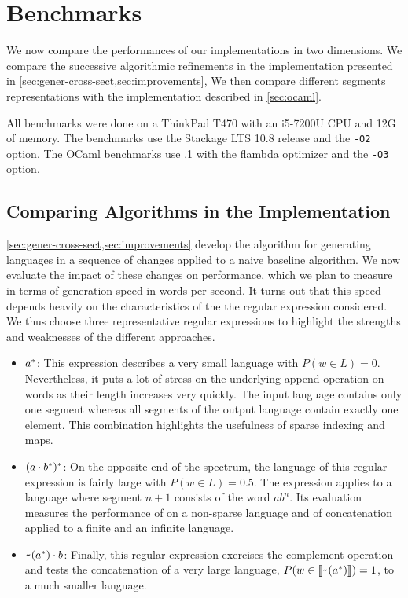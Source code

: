 \section{Benchmarks}
\label{sec:bench}


We now compare the performances of our implementations in two dimensions.
We compare the successive algorithmic refinements in the \haskell
implementation presented in \cref{sec:gener-cross-sect,sec:improvements},
We then compare different segments representations with
the \ocaml implementation described in \cref{sec:ocaml}.

All benchmarks were done on a ThinkPad T470 with an i5-7200U CPU and 12G of memory.
The \haskell benchmarks use the Stackage LTS 10.8 release and the \texttt{-O2} option.
The OCaml benchmarks use .1 with the flambda optimizer and the
\texttt{-O3} option.

\subsection{Comparing Algorithms in the \haskell Implementation}

\cref{sec:gener-cross-sect,sec:improvements} develop the
algorithm for generating languages in a sequence of changes applied to
a naive baseline algorithm. We now evaluate the impact of these
changes on performance, which we plan to measure in terms of
generation speed in words per second. It turns out that this speed
depends heavily on the characteristics of the the regular expression
considered. We thus choose three representative regular expressions to highlight the
strengths and weaknesses of the different approaches.
\begin{itemize}
\item $a^*$: This expression describes a very small language with $P (w\in L) = 0$.
  Nevertheless, it puts a lot of stress on the underlying
  append operation on words as their length increases very quickly.
  The input language contains only one segment whereas all segments of
  the output language contain exactly one element. This combination
  highlights the usefulness of sparse indexing and maps.
\item $(a \cdot{b^*})^*$: On the opposite end of the
  spectrum, the language of this regular expression is fairly large
  with $P (w\in L)=0.5$. The expression applies  to a
  language where segment $n+1$ consists of the word $ab^n$. Its
  evaluation measures the performance of  on a non-sparse
  language and of {concatenation} applied to a finite and an infinite
  language.
\item $\texttt{\textasciitilde}{(a^*)} \cdot{b}$: Finally, this regular
  expression exercises the complement operation and tests the
  concatenation of a very large language, 
  $P (w\in \llbracket\texttt{\textasciitilde}{(a^*)}\rrbracket) = 1$, to a much smaller
  language.
\end{itemize}

